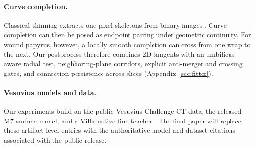 \paragraph{Curve completion.}
Classical thinning extracts one-pixel skeletons from binary images
\cite{zhang1984fast}. Curve completion can then be posed as endpoint pairing under geometric
continuity. For wound papyrus, however, a locally smooth completion can cross from one wrap
to the next. Our postprocess therefore combines 2D tangents with an umbilicus-aware radial
test, neighboring-plane corridors, explicit anti-merger and crossing gates, and
connection persistence across slices (Appendix~\ref{sec:fitter}).

\paragraph{Vesuvius models and data.}
Our experiments build on the public Vesuvius Challenge CT data, the released M7
surface model, and a Villa native-fine teacher
\cite{vesuviusChallenge,m7Artifact,villaTeacher}.
The final paper will replace these artifact-level entries with the authoritative
model and dataset citations associated with the public release.
